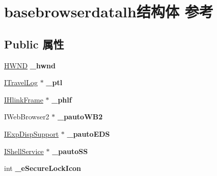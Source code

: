\hypertarget{structbasebrowserdatalh}{}\section{basebrowserdatalh结构体 参考}
\label{structbasebrowserdatalh}
\subsection*{Public 属性}
\begin{DoxyCompactItemize}
\item 
\mbox{\label{structbasebrowserdatalh_a9383afb3f809abbf685890f874402297}} 
\hyperlink{interfacevoid}{H\+W\+ND} {\bfseries \+\_\+hwnd}
\item 
\mbox{\label{structbasebrowserdatalh_a95c43b0e7aace73ff226ca36284a8a78}} 
\hyperlink{interface_i_travel_log}{I\+Travel\+Log} $\ast$ {\bfseries \+\_\+ptl}
\item 
\mbox{\label{structbasebrowserdatalh_aaffcba950d461018bb7246760211a941}} 
\hyperlink{interface_i_hlink_frame}{I\+Hlink\+Frame} $\ast$ {\bfseries \+\_\+phlf}
\item 
\mbox{\label{structbasebrowserdatalh_a26a8d295a745a3ad690616e5601ffd3a}} 
I\+Web\+Browser2 $\ast$ {\bfseries \+\_\+pauto\+W\+B2}
\item 
\mbox{\label{structbasebrowserdatalh_a76550492d57cd8bbf3fba54d0a6e3ca2}} 
\hyperlink{interface_i_exp_disp_support}{I\+Exp\+Disp\+Support} $\ast$ {\bfseries \+\_\+pauto\+E\+DS}
\item 
\mbox{\label{structbasebrowserdatalh_a1aaf37e8f6acd67fed6e47a24dd00ade}} 
\hyperlink{interface_i_shell_service}{I\+Shell\+Service} $\ast$ {\bfseries \+\_\+pauto\+SS}
\item 
\mbox{\label{structbasebrowserdatalh_a0e4986b3148cb5312eae2a26e46bf666}} 
int {\bfseries \+\_\+e\+Secure\+Lock\+Icon}
\item 
\mbox{\label{structbasebrowserdatalh_a7e0d880056b9db648d75d5a1b9866f71}} 

\end{DoxyCompactItemize}
